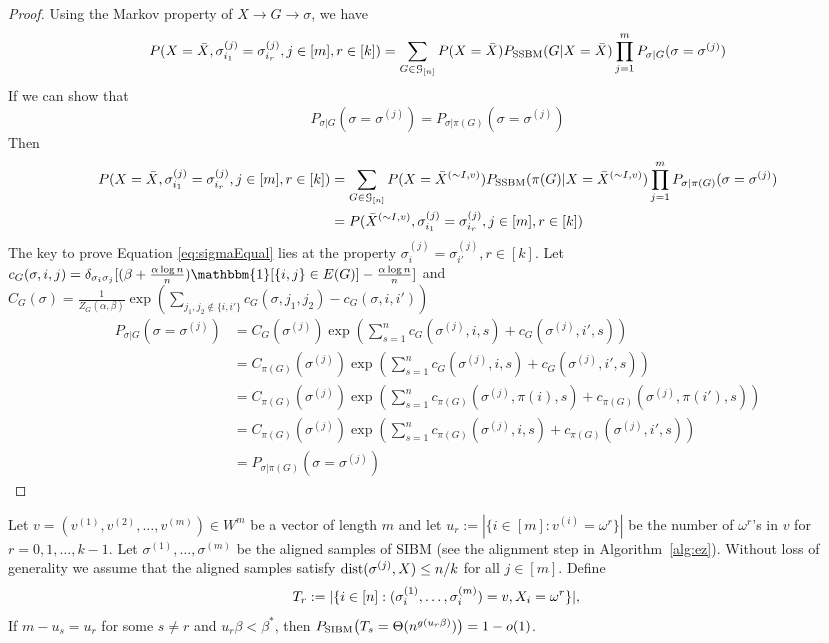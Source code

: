 \documentclass{article}
\begin{document}
\begin{proof}
Using the Markov property of $X \to G \to \sigma$, we have
\begin{align*}
P(X=\bar{X}, \sigma_{i_1}^{(j)}=\sigma_{i_r}^{(j)}, j\in[m], r\in[k])& = \sum_{G \in \mathcal{G}_{[n]}} P(X=\bar{X}) P_{\operatorname{SSBM}}(G  | X = \bar{X})\prod_{j=1}^m P_{\sigma | G}(\sigma =\sigma^{(j)})\\
\end{align*}
If we can show that 
\begin{equation}\label{eq:sigmaEqual}
P_{\sigma | G}(\sigma =\sigma^{(j)}) = P_{\sigma | \pi(G)}(\sigma =\sigma^{(j)})
\end{equation}
Then 
\begin{align*}
P(X=\bar{X}, \sigma_{i_1}^{(j)}=\sigma_{i_r}^{(j)}, j\in[m], r\in[k]) &
= \sum_{G \in \mathcal{G}_{[n]}} P(X=\bar{X}^{(\sim I,v)})
P_{\operatorname{SSBM}}(\pi(G)  | X = \bar{X}^{(\sim I,v)})\prod_{j=1}^m P_{\sigma | \pi(G)}(\sigma =\sigma^{(j)})\\
& = P(\bar{X}^{(\sim I,v)}, \sigma_{i_1}^{(j)}=\sigma_{i_r}^{(j)}, j\in[m], r\in[k])
\end{align*}
The key to prove Equation \eqref{eq:sigmaEqual} lies at the property
$\sigma^{(j)}_{i} = \sigma^{(j)}_{i'}, r\in [k]$.
Let $c_G(\sigma, i,j) = \delta_{\sigma_i \sigma_j}[(\beta + \frac{\alpha \log n}{n})\mathbbm{1}[\{i,j\}\in E(G)]  - \frac{\alpha \log n}{n}]$
and $C_G(\sigma) = \frac{1}{Z_G(\alpha, \beta)}\exp(\sum_{j_1, j_2 \not\in \{i,i'\}} c_G(\sigma, j_1, j_2) - c_G(\sigma, i, i'))$
\begin{align*}
P_{\sigma | G}(\sigma =\sigma^{(j)}) & = C_G(\sigma^{(j)})\exp(\sum_{s=1}^n c_G(\sigma^{(j)}, i, s) + c_G(\sigma^{(j)}, i', s)) \\
& = C_{\pi(G)}(\sigma^{(j)})\exp(\sum_{s=1}^n c_G(\sigma^{(j)}, i, s) + c_G(\sigma^{(j)}, i', s) ) \\
& = C_{\pi(G)}(\sigma^{(j)})\exp(\sum_{s=1}^n c_{\pi(G)}(\sigma^{(j)}, \pi(i), s) + c_{\pi(G)}(\sigma^{(j)}, \pi(i'), s)) \\
& = C_{\pi(G)}(\sigma^{(j)})\exp(\sum_{s=1}^n c_{\pi(G)}(\sigma^{(j)}, i, s) + c_{\pi(G)}(\sigma^{(j)}, i', s)) \\
& = P_{\sigma | \pi(G)}(\sigma =\sigma^{(j)})
\end{align*}
\end{proof}
\begin{lemma}  \label{lm:cvs}
	Let $v=(v^{(1)},v^{(2)},\dots,v^{(m)})\in W^m$ be a vector of length $m$
	and let $u_r:=|\{i\in[m]:v^{(i)}=\omega^r\}|$ be the number of $\omega^r$'s in $v$ for $r=0,1,\dots, k-1$.
	Let $\sigma^{(1)},\dots,\sigma^{(m)}$ be the aligned samples of SIBM (see the alignment step in Algorithm~\ref{alg:ez}).
	Without loss of generality we assume that the aligned samples satisfy  $\operatorname{dist}(\sigma^{(j)}, X) \le n/k$ for all $j\in[m]$.
	Define 
	\begin{equation}  \label{eq:rl}
	T_r:= | \{i\in[n]:(\sigma_i^{(1)},\dots,\sigma_i^{(m)})=v, X_i=\omega^r \} | ,  \\
	\end{equation}
	If $m-u_s = u_r$ for some $s\neq r$ and $u_r\beta<\beta^\ast$, then
	$P_{\operatorname{SIBM}}\big(T_s = \Theta(n^{g(u_r\beta)}) \big) = 1-o(1)$.
\end{lemma}
\end{document}
